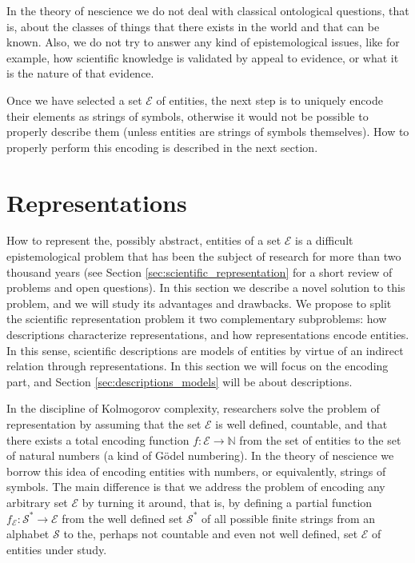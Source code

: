 In the theory of nescience we do not deal with classical ontological questions, that is, about the classes of things that there exists in the world and that can be known. Also, we do not try to answer any kind of epistemological issues, like for example, how scientific knowledge is validated by appeal to evidence, or what it is the nature of that evidence.

Once we have selected a set $\mathcal{E}$ of entities, the next step is to uniquely encode their elements as strings of symbols, otherwise it would not be possible to properly describe them (unless entities are strings of symbols themselves). How to properly perform this encoding is described in the next section.

%
%

\section{Representations}
\label{sec:representations}

How to represent the, possibly abstract, entities of a set $\mathcal{E}$ is a difficult epistemological problem that has been the subject of research for more than two thousand years (see Section \ref{sec:scientific_representation} for a short review of problems and open questions). In this section we describe a novel solution to this problem, and we will study its advantages and drawbacks. We propose to split the scientific representation problem it two complementary subproblems: how descriptions characterize representations, and how representations encode entities. In this sense, scientific descriptions are models of entities by virtue of an indirect relation through representations. In this section we will focus on the encoding part, and Section \ref{sec:descriptions_models} will be about descriptions.

In the discipline of Kolmogorov complexity, researchers solve the problem of representation by assuming that the set $\mathcal{E}$ is well defined, countable, and that there exists a total encoding function $f:\mathcal{E} \rightarrow \mathbb{N}$ from the set of entities to the set of natural numbers (a kind of Gödel numbering). In the theory of nescience we borrow this idea of encoding entities with numbers, or equivalently, strings of symbols. The main difference is that we address the problem of encoding any arbitrary set $\mathcal{E}$ by turning it around, that is, by defining a partial function $f_\mathcal{E}:\mathcal{S}^\ast \rightarrow \mathcal{E}$ from the well defined set $\mathcal{S}^\ast$ of all possible finite strings from an alphabet $\mathcal{S}$ to the, perhaps not countable and even not well defined, set $\mathcal{E}$ of entities under study.

